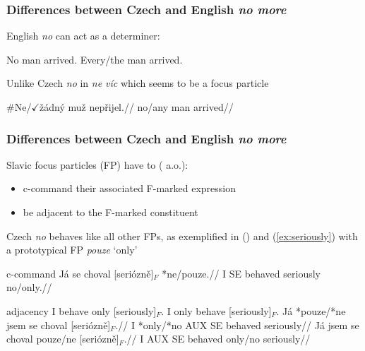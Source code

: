 \documentclass[10pt
]{beamer}
\begin{document}
\begin{frame}
  \frametitle{Differences between Czech and English \textit{no more}}

English \textit{no} can act as a determiner:

\pex \a No man arrived.
\a Every/the man arrived.
\xe

Unlike Czech \textit{no} in \textit{ne víc} which seems to be a focus particle

\ex \begingl
\gla \#Ne/$\checkmark$žádný muž nepřijel.//
\glb no/any man arrived//
\endgl
\xe

\end{frame}

\begin{frame}
  \frametitle{Differences between Czech and English \textit{no more}}

  Slavic focus particles (FP) have to (\cite{jasinskaja_information_2012} a.o.):
  
  \begin{itemize}
    \item c-command their associated F-marked expression
    \item be adjacent to the F-marked constituent
   
  \end{itemize}

\end{frame}

\begin{frame}

  Czech \textit{no} behaves like all other FPs, as exemplified in (\nextx) and (\ref{ex:seriously}) with a prototypical FP \emph{pouze} `only'
    

  \ex \hfill c-command
  \begingl
  \gla Já se choval {[}seriózně{]}\(_F\) *ne/pouze.//
  \glb I SE behaved seriously no/only.//
  \endgl
  \xe

  \pex\label{ex:seriously}\hfill adjacency
   \a I behave only {[}seriously{]}\(_F\). 
  \a I only behave {[}seriously{]}\(_F\). 
  \a
  \begingl
  \gla Já *pouze/*ne jsem se choval {[}seriózně{]}\(_F\).//
  \glb I *only/*no AUX SE behaved seriously//
  \endgl
  \a
  \begingl 
  \gla  Já jsem se choval pouze/ne {[}seriózně{]}\(_F\).//
  \glb I AUX SE behaved only/no seriously//
  \endgl
  \xe

\end{frame}
\end{document}
